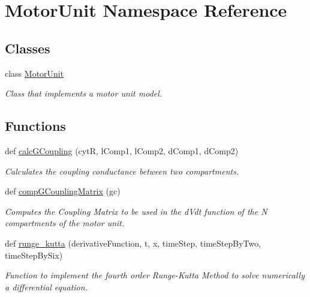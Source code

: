 \hypertarget{namespace_motor_unit}{}\section{Motor\+Unit Namespace Reference}
\label{namespace_motor_unit}
\subsection*{Classes}
\begin{DoxyCompactItemize}
\item 
class \hyperlink{class_motor_unit_1_1_motor_unit}{Motor\+Unit}
\begin{DoxyCompactList}\small\item\em Class that implements a motor unit model. \end{DoxyCompactList}\end{DoxyCompactItemize}
\subsection*{Functions}
\begin{DoxyCompactItemize}
\item 
def \hyperlink{namespace_motor_unit_a5196399a48a590dfd9825f211980d2dc}{calc\+G\+Coupling} (cytR, l\+Comp1, l\+Comp2, d\+Comp1, d\+Comp2)
\begin{DoxyCompactList}\small\item\em Calculates the coupling conductance between two compartments. \end{DoxyCompactList}\item 
def \hyperlink{namespace_motor_unit_a8c3fb31fb3c8c894af37c6b822d10835}{comp\+G\+Coupling\+Matrix} (gc)
\begin{DoxyCompactList}\small\item\em Computes the Coupling Matrix to be used in the d\+Vdt function of the N compartments of the motor unit. \end{DoxyCompactList}\item 
def \hyperlink{namespace_motor_unit_ab7df982e859623662808361f779572f5}{runge\+\_\+kutta} (derivative\+Function, t, x, time\+Step, time\+Step\+By\+Two, time\+Step\+By\+Six)
\begin{DoxyCompactList}\small\item\em Function to implement the fourth order Runge-\/\+Kutta Method to solve numerically a differential equation. \end{DoxyCompactList}\end{DoxyCompactItemize}


